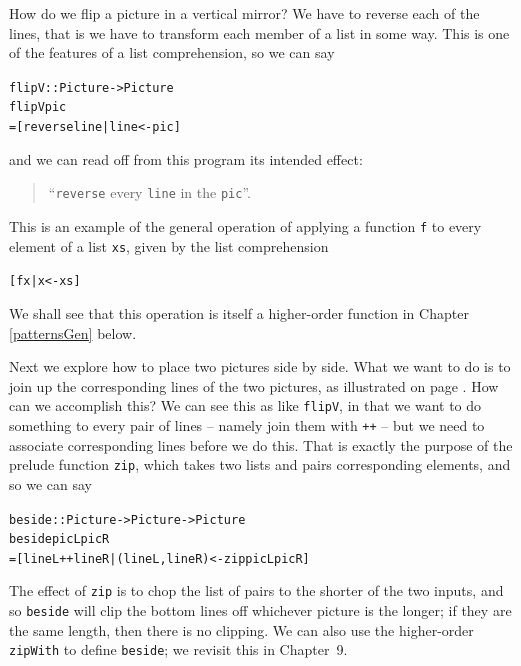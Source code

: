 How do we flip a picture in a vertical mirror? We have to reverse each
of the lines, that is we have to transform each member of a list in some
way. This is one of the features of a list comprehension, so we can say
\begin{alltt}
flipV :: Picture -> Picture
flipV pic 
  = [ reverse line | line <- pic ]
\end{alltt}
and we can read off from this program its intended effect:
\begin{quote}
``\texttt{reverse} every \texttt{line} in the \texttt{pic}''.
\end{quote}
This is an example of the general operation of applying a function \texttt{f} to every 
element of a list \texttt{xs}, given by the list comprehension
\begin{alltt}
[ f x | x <- xs ]
\end{alltt}
We shall see that this operation is itself a higher-order function in
Chapter \ref{patternsGen} below.

Next we explore how to place two pictures side by side. What we want to
do is to join up the corresponding lines of the two pictures, as
illustrated on page \pageref{beside}. How can we accomplish this? We
can see this as like \texttt{flipV}, in that we want to do something to
every pair of lines -- namely join them with \texttt{++} -- 
but we need to associate corresponding lines before
we do this. That is exactly the purpose of the prelude
function \texttt{zip}, which takes two lists and
pairs corresponding elements, and so we can
say
\begin{alltt}
beside :: Picture -> Picture -> Picture
beside picL picR
  = [ lineL ++ lineR | (lineL,lineR) <- zip picL picR ]
\end{alltt}
The effect of \texttt{zip} is to chop the list of pairs to the shorter
of the two inputs, and so \texttt{beside} will clip the bottom lines
off whichever picture is the longer; if they are the same length, then
there is no clipping. We can also use the higher-order \texttt{zipWith}
to define \texttt{beside}; we revisit this in Chapter~9.

